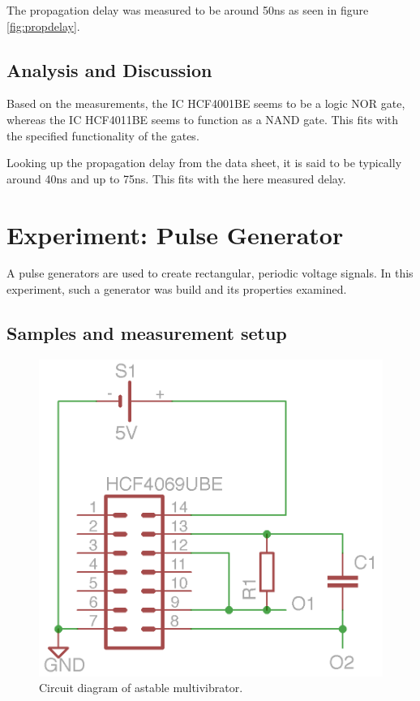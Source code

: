 \documentclass[journal]{IEEEtran}
\begin{document}
The propagation delay was measured to be around 50ns as seen in figure
\ref{fig:propdelay}.

\subsection{Analysis and Discussion}

Based on the measurements, the IC HCF4001BE seems to be a logic NOR gate,
whereas the IC HCF4011BE seems to function as a NAND gate. This fits with the
specified functionality of the gates.

Looking up the propagation delay from the data sheet, it is said to be typically
around 40ns and up to 75ns. This fits with the here measured delay.

\section{Experiment: Pulse Generator}

A pulse generators are used to create rectangular, periodic voltage signals. In
this experiment, such a generator was build and its properties examined. 

\subsection{Samples and measurement setup}

\begin{figure}[h!]
  \centering
   \includegraphics[]{boards/astabil_multivibrator.png}
   \caption{Circuit diagram of astable multivibrator.}
   \label{fig:am_board}
\end{figure}
\end{document}

